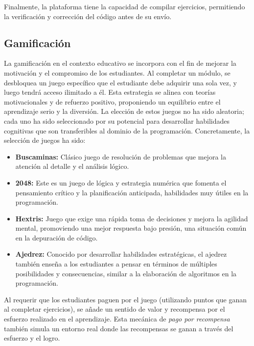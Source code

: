 Finalmente, la plataforma tiene la capacidad de compilar ejercicios, permitiendo la verificación y corrección del código antes de su envío.

\subsection{Gamificación}

La gamificación en el contexto educativo se incorpora con el fin de mejorar la motivación y el compromiso de los estudiantes. Al completar un módulo, se desbloquea un juego específico que el estudiante debe adquirir una sola vez, y luego tendrá acceso ilimitado a él. Esta estrategia se alinea con teorías motivacionales y de refuerzo positivo, proponiendo un equilibrio entre el aprendizaje serio y la diversión. La elección de estos juegos no ha sido aleatoria; cada uno ha sido seleccionado por su potencial para desarrollar habilidades cognitivas que son transferibles al dominio de la programación. Concretamente, la selección de juegos ha sido:

\begin{itemize}
    \item \textbf{Buscaminas:} Clásico juego de resolución de problemas que mejora la atención al detalle y el análisis lógico.
    
    \item \textbf{2048:} Este es un juego de lógica y estrategia numérica que fomenta el pensamiento crítico y la planificación anticipada, habilidades muy útiles en la programación.
    
    \item \textbf{Hextris:} Juego que exige una rápida toma de decisiones y mejora la agilidad mental, promoviendo una mejor respuesta bajo presión, una situación común en la depuración de código.
    
    \item \textbf{Ajedrez:} Conocido por desarrollar habilidades estratégicas, el ajedrez también enseña a los estudiantes a pensar en términos de múltiples posibilidades y consecuencias, similar a la elaboración de algoritmos en la programación.
\end{itemize}

Al requerir que los estudiantes paguen por el juego (utilizando puntos que ganan al completar ejercicios), se añade un sentido de valor y recompensa por el esfuerzo realizado en el aprendizaje. Esta mecánica de  \textit{pago por recompensa} también simula un entorno real donde las recompensas se ganan a través del esfuerzo y el logro.

